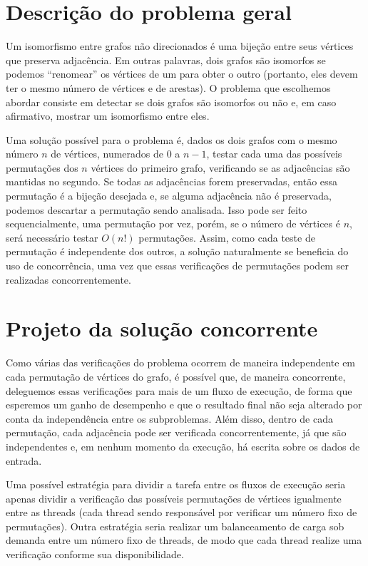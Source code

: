 \section{Descrição do problema geral}

  Um isomorfismo entre grafos não direcionados é uma bijeção entre seus vértices que preserva adjacência. Em outras palavras, dois grafos são isomorfos se podemos ``renomear'' os vértices de um para obter o outro (portanto, eles devem ter o mesmo número de vértices e de arestas). O problema que escolhemos abordar consiste em detectar se dois grafos são isomorfos ou não e, em caso afirmativo, mostrar um isomorfismo entre eles.

  Uma solução possível para o problema é, dados os dois grafos com o mesmo número $n$ de vértices, numerados de $0$ a $n-1$, testar cada uma das possíveis permutações dos $n$ vértices do primeiro grafo, verificando se as adjacências são mantidas no segundo. Se todas as adjacências forem preservadas, então essa permutação é a bijeção desejada e, se alguma adjacência não é preservada, podemos descartar a permutação sendo analisada. Isso pode ser feito sequencialmente, uma permutação por vez, porém, se o número de vértices é $n$, será necessário testar $O(n!)$ permutações. Assim, como cada teste de permutação é independente dos outros, a solução naturalmente se beneficia do uso de concorrência, uma vez que essas verificações de permutações podem ser realizadas concorrentemente.


\section{Projeto da solução concorrente}

  Como várias das verificações do problema ocorrem de maneira independente em cada permutação de vértices do grafo, é possível que, de maneira concorrente, deleguemos essas verificações para mais de um fluxo de execução, de forma que esperemos um ganho de desempenho e que o resultado final não seja alterado por conta da independência entre os subproblemas. Além disso, dentro de cada permutação, cada adjacência pode ser verificada concorrentemente, já que são independentes e, em nenhum momento da execução, há escrita sobre os dados de entrada.

  Uma possível estratégia para dividir a tarefa entre os fluxos de execução seria apenas dividir a verificação das possíveis permutações de vértices igualmente entre as threads (cada thread sendo responsável por verificar um número fixo de permutações). Outra estratégia seria realizar um balanceamento de carga sob demanda entre um número fixo de threads, de modo que cada thread realize uma verificação conforme sua disponibilidade.


